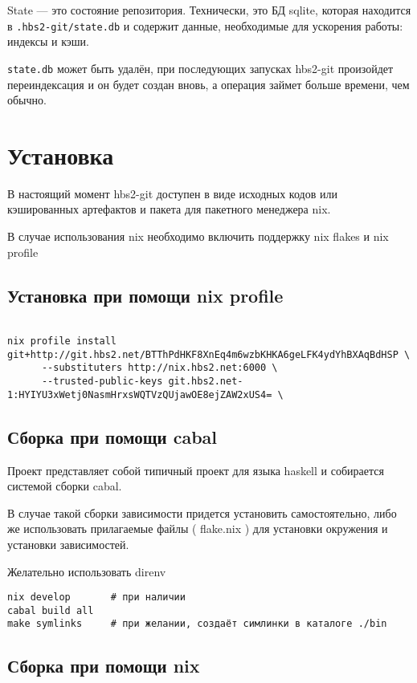 \documentclass[11pt,a4paper]{article}
\begin{document}
State --- это состояние репозитория. Технически, это БД sqlite,
которая находится в \texttt{.hbs2-git/state.db} и содержит данные,
необходимые для ускорения работы: индексы и кэши.

\texttt{state.db} может быть удалён,  при последующих запусках
hbs2-git произойдет переиндексация и он будет создан вновь,
а операция займет больше времени, чем обычно.


\section{Установка}

В настоящий момент hbs2-git доступен в виде исходных кодов или кэшированных
артефактов и пакета для пакетного менеджера nix.

В случае использования nix необходимо включить поддержку nix flakes и nix profile

\subsection{Установка при помощи nix profile}

\begin{verbatim}

nix profile install git+http://git.hbs2.net/BTThPdHKF8XnEq4m6wzbKHKA6geLFK4ydYhBXAqBdHSP \
      --substituters http://nix.hbs2.net:6000 \
      --trusted-public-keys git.hbs2.net-1:HYIYU3xWetj0NasmHrxsWQTVzQUjawOE8ejZAW2xUS4= \
\end{verbatim}

\subsection{Сборка при помощи cabal}

Проект представляет собой типичный проект для языка haskell и собирается системой сборки cabal.

В случае такой сборки зависимости придется установить самостоятельно, либо же использовать
прилагаемые файлы ( flake.nix ) для установки окружения и установки зависимостей.

Желательно использовать direnv

\begin{verbatim}
nix develop       # при наличии
cabal build all
make symlinks     # при желании, создаёт симлинки в каталоге ./bin
\end{verbatim}

\subsection{Сборка при помощи nix}
\end{document}
